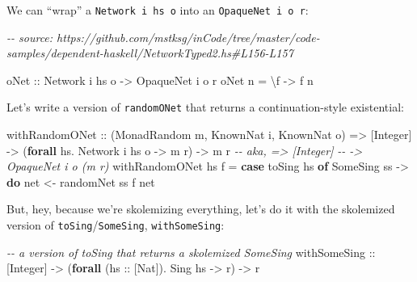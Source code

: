 \documentclass[]{article}
\newenvironment{Shaded}{}{}
\newcommand{\CommentTok}[1]{\textcolor[rgb]{0.38,0.63,0.69}{\textit{#1}}}
\newcommand{\DataTypeTok}[1]{\textcolor[rgb]{0.56,0.13,0.00}{#1}}
\newcommand{\KeywordTok}[1]{\textcolor[rgb]{0.00,0.44,0.13}{\textbf{#1}}}
\newcommand{\NormalTok}[1]{#1}
\newcommand{\OperatorTok}[1]{\textcolor[rgb]{0.40,0.40,0.40}{#1}}
\newcommand{\OtherTok}[1]{\textcolor[rgb]{0.00,0.44,0.13}{#1}}
\begin{document}
We can ``wrap'' a \texttt{Network\ i\ hs\ o} into an
\texttt{OpaqueNet\textquotesingle{}\ i\ o\ r}:

\begin{Shaded}
\begin{Highlighting}[]
\CommentTok{{-}{-} source: https://github.com/mstksg/inCode/tree/master/code{-}samples/dependent{-}haskell/NetworkTyped2.hs\#L156{-}L157}

\OtherTok{oNet\textquotesingle{} ::} \DataTypeTok{Network}\NormalTok{ i hs o }\OtherTok{{-}\textgreater{}} \DataTypeTok{OpaqueNet\textquotesingle{}}\NormalTok{ i o r}
\NormalTok{oNet\textquotesingle{} n }\OtherTok{=}\NormalTok{ \textbackslash{}f }\OtherTok{{-}\textgreater{}}\NormalTok{ f n}
\end{Highlighting}
\end{Shaded}

Let's write a version of \texttt{randomONet} that returns a continuation-style
existential:

\begin{Shaded}
\begin{Highlighting}[]
\OtherTok{withRandomONet\textquotesingle{} ::}\NormalTok{ (}\DataTypeTok{MonadRandom}\NormalTok{ m, }\DataTypeTok{KnownNat}\NormalTok{ i, }\DataTypeTok{KnownNat}\NormalTok{ o)}
                \OtherTok{=\textgreater{}}\NormalTok{ [}\DataTypeTok{Integer}\NormalTok{]}
                \OtherTok{{-}\textgreater{}}\NormalTok{ (}\KeywordTok{forall}\NormalTok{ hs}\OperatorTok{.} \DataTypeTok{Network}\NormalTok{ i hs o }\OtherTok{{-}\textgreater{}}\NormalTok{ m r)}
                \OtherTok{{-}\textgreater{}}\NormalTok{ m r}
\CommentTok{{-}{-}         aka, =\textgreater{} [Integer]}
\CommentTok{{-}{-}              {-}\textgreater{} OpaqueNet\textquotesingle{} i o (m r)}
\NormalTok{withRandomONet\textquotesingle{} hs f }\OtherTok{=} \KeywordTok{case}\NormalTok{ toSing hs }\KeywordTok{of}
                         \DataTypeTok{SomeSing}\NormalTok{ ss }\OtherTok{{-}\textgreater{}} \KeywordTok{do}
\NormalTok{                           net }\OtherTok{\textless{}{-}}\NormalTok{ randomNet\textquotesingle{} ss}
\NormalTok{                           f net}
\end{Highlighting}
\end{Shaded}

But, hey, because we're skolemizing everything, let's do it with the skolemized
version of \texttt{toSing}/\texttt{SomeSing}, \texttt{withSomeSing}:

\begin{Shaded}
\begin{Highlighting}[]
\CommentTok{{-}{-} a version of \textasciigrave{}toSing\textasciigrave{} that returns a skolemized \textasciigrave{}SomeSing\textasciigrave{}}
\OtherTok{withSomeSing ::}\NormalTok{ [}\DataTypeTok{Integer}\NormalTok{]}
             \OtherTok{{-}\textgreater{}}\NormalTok{ (}\KeywordTok{forall}\NormalTok{ (}\OtherTok{hs ::}\NormalTok{ [}\DataTypeTok{Nat}\NormalTok{])}\OperatorTok{.} \DataTypeTok{Sing}\NormalTok{ hs }\OtherTok{{-}\textgreater{}}\NormalTok{ r)}
             \OtherTok{{-}\textgreater{}}\NormalTok{ r}
\end{Highlighting}
\end{Shaded}
\end{document}
